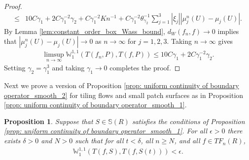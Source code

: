 \documentclass[11pt]{article}
\newtheorem{prop}[thm]{Proposition}
\theoremstyle{remark}
\theoremstyle{definition}
\newcommand{\m}[1]{\mathbb{#1}}
\begin{document}
\begin{proof}
\begin{align*}
    \leq &10 C \gamma_1 + 2 C \gamma_1^{-2}\gamma_2 +  C \gamma_1^{-2} K n^{-1} + C \gamma_1^{-2} \theta_{\gamma_2}^{-1} \sum_{j=1}^3 |\xi_j| |\mu_j^n(U)-\mu_j(U)|.
\end{align*}
By Lemma \ref{lem:constant_order_box_Wass_bound}, $d_W(f_n,f)\to 0$ implies that $|\mu_j^n(U)-\mu_j(U)|\to 0$ as $n\to \infty$ for $j=1,2,3$. Taking $n\to \infty$ gives 
\begin{align*}
    \limsup_{n\to \infty} \m W_1^{1,1}(T(f_n,P),T(f,P)) \leq 10 C \gamma_1 + 2 C \gamma_1^{-2}\gamma_2.
\end{align*}
Setting $\gamma_2=\gamma_1^{3}$ and taking $\gamma_1\to 0$ completes the proof.
\end{proof}

Next we prove a version of Proposition \ref{prop: uniform continuity of boundary operator_smooth_2} for tiling flows and small patch surfaces as in Proposition \ref{prop: uniform continuity of boundary operator_smooth_1}.
\begin{prop}\label{prop: surface perturbation for tiling flows}
    Suppose that $S\in \m S(R)$ satisfies the conditions of Proposition \ref{prop: uniform continuity of boundary operator_smooth_1}. For all $\epsilon>0$ there exists $\delta>0$ and $N>0$ such that for all $t<\delta$, all $n\geq N$, and all $f\in TF_n(R)$, 
    \begin{align*}
        \m W_1^{1,1}(T(f,S), T(f,S(t)) ) < \epsilon.
    \end{align*}
\end{prop}
\end{document}
